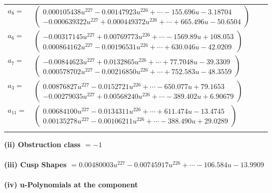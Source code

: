 \documentclass[1p]{elsarticle_modified}
\theoremstyle{definition}
\begin{document}
\begin{tabular}{m{7pt} m{180pt} m{7pt} m{180pt} }
\flushright $a_{8}=$&$\begin{pmatrix}0.000105438 u^{227}-0.00147923 u^{226}+\cdots-155.696 u-3.18704\\-0.000639322 u^{227}+0.000449372 u^{226}+\cdots+665.496 u-50.6504\end{pmatrix}$ \\
\flushright $a_{6}=$&$\begin{pmatrix}-0.00317145 u^{227}+0.00769773 u^{226}+\cdots-1569.89 u+108.053\\0.000864162 u^{227}-0.00196531 u^{226}+\cdots+630.046 u-42.0209\end{pmatrix}$ \\
\flushright $a_{7}=$&$\begin{pmatrix}-0.00844623 u^{227}+0.0132865 u^{226}+\cdots+77.7048 u-39.3309\\0.000578702 u^{227}-0.00216850 u^{226}+\cdots+752.583 u-48.3559\end{pmatrix}$ \\
\flushright $a_{3}=$&$\begin{pmatrix}0.00876827 u^{227}-0.0152721 u^{226}+\cdots-650.077 u+79.1653\\-0.00279035 u^{227}+0.00568240 u^{226}+\cdots-389.402 u+6.90679\end{pmatrix}$ \\
\flushright $a_{11}=$&$\begin{pmatrix}0.00684100 u^{227}-0.0134311 u^{226}+\cdots+611.474 u-13.4745\\0.00135278 u^{227}-0.00106211 u^{226}+\cdots-388.490 u+29.0289\end{pmatrix}$\\&\end{tabular}
\flushleft \textbf{(ii) Obstruction class $= -1$}\\~\\
\flushleft \textbf{(iii) Cusp Shapes $= 0.00480003 u^{227}-0.00745917 u^{226}+\cdots-106.584 u-13.9909$}\\~\\
\newpage\renewcommand{\arraystretch}{1}
\flushleft \textbf{(iv) u-Polynomials at the component}\newline \\
\end{document}
